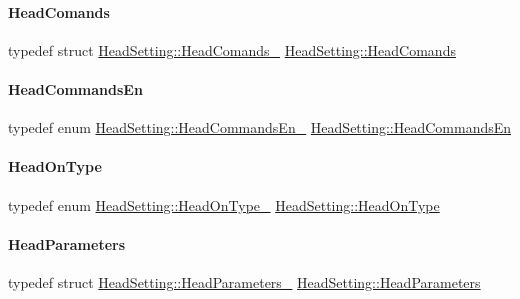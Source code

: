 \paragraph{\texorpdfstring{Head\+Comands}{HeadComands}}
{\footnotesize\ttfamily typedef struct \mbox{\hyperlink{structHeadSetting_1_1HeadComands__}{Head\+Setting\+::\+Head\+Comands\+\_\+}} \mbox{\hyperlink{classHeadSetting_a53d6fb7e789941346f1fb2094317a78e}{Head\+Setting\+::\+Head\+Comands}}}

\mbox{\label{classHeadSetting_afe9523cb7fbbae2db026b1fca4a02be3}} 
\paragraph{\texorpdfstring{Head\+Commands\+En}{HeadCommandsEn}}
{\footnotesize\ttfamily typedef enum \mbox{\hyperlink{classHeadSetting_aa59726f2f3a2b18d1735f9983277da98}{Head\+Setting\+::\+Head\+Commands\+En\+\_\+}} \mbox{\hyperlink{classHeadSetting_afe9523cb7fbbae2db026b1fca4a02be3}{Head\+Setting\+::\+Head\+Commands\+En}}}

\mbox{\label{classHeadSetting_adc03f84127a636868de8f79fb7b5046d}} 
\paragraph{\texorpdfstring{Head\+On\+Type}{HeadOnType}}
{\footnotesize\ttfamily typedef enum \mbox{\hyperlink{classHeadSetting_a4b20eca534a73ccbb980a216ea17c2a0}{Head\+Setting\+::\+Head\+On\+Type\+\_\+}} \mbox{\hyperlink{classHeadSetting_adc03f84127a636868de8f79fb7b5046d}{Head\+Setting\+::\+Head\+On\+Type}}}

\mbox{\label{classHeadSetting_ab604bc48df56fc11dd649357ae7b45b8}} 
\paragraph{\texorpdfstring{Head\+Parameters}{HeadParameters}}
{\footnotesize\ttfamily typedef struct \mbox{\hyperlink{structHeadSetting_1_1HeadParameters__}{Head\+Setting\+::\+Head\+Parameters\+\_\+}} \mbox{\hyperlink{classHeadSetting_ab604bc48df56fc11dd649357ae7b45b8}{Head\+Setting\+::\+Head\+Parameters}}}



